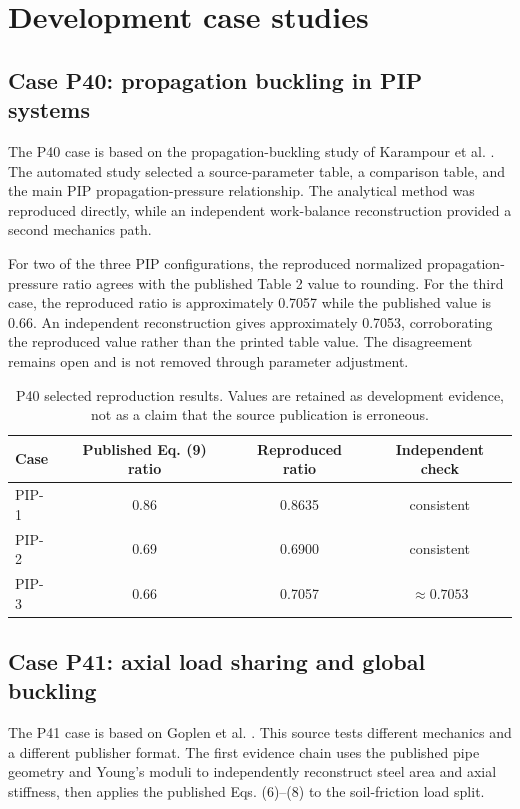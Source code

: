 \section{Development case studies}

\subsection{Case P40: propagation buckling in PIP systems}
The P40 case is based on the propagation-buckling study of Karampour et al. \cite{Karampour2017}. The automated study selected a source-parameter table, a comparison table, and the main PIP propagation-pressure relationship. The analytical method was reproduced directly, while an independent work-balance reconstruction provided a second mechanics path.

For two of the three PIP configurations, the reproduced normalized propagation-pressure ratio agrees with the published Table 2 value to rounding. For the third case, the reproduced ratio is approximately 0.7057 while the published value is 0.66. An independent reconstruction gives approximately 0.7053, corroborating the reproduced value rather than the printed table value. The disagreement remains open and is not removed through parameter adjustment.

\begin{table}[htbp]
\centering
\caption{P40 selected reproduction results. Values are retained as development evidence, not as a claim that the source publication is erroneous.}
\label{tab:p40}
\begin{tabular}{lccc}
\toprule
Case & Published Eq. (9) ratio & Reproduced ratio & Independent check \\
\midrule
PIP-1 & 0.86 & 0.8635 & consistent \\
PIP-2 & 0.69 & 0.6900 & consistent \\
PIP-3 & 0.66 & 0.7057 & $\approx 0.7053$ \\
\bottomrule
\end{tabular}
\end{table}

\subsection{Case P41: axial load sharing and global buckling}
The P41 case is based on Goplen et al. \cite{Goplen2011}. This source tests different mechanics and a different publisher format. The first evidence chain uses the published pipe geometry and Young's moduli to independently reconstruct steel area and axial stiffness, then applies the published Eqs. (6)--(8) to the soil-friction load split.

